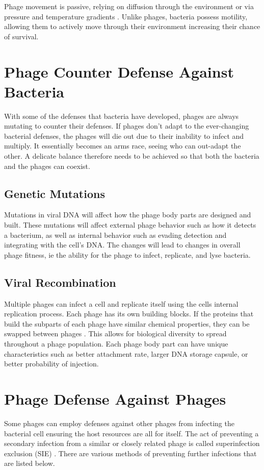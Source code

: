 Phage movement is passive, relying on diffusion through the environment or via pressure and temperature gradients \cite{lohrmannInfluenceBacterialSwimming2024}. 
Unlike phages, bacteria possess motility, allowing them to actively move through their environment increasing their chance of survival. 

\section{Phage Counter Defense Against Bacteria}
With some of the defenses that bacteria have developed, phages are always mutating to counter their defenses. 
If phages don't adapt to the ever-changing bacterial defenses, the phages will die out due to their inability to infect and multiply. 
It essentially becomes an arms race, seeing who can out-adapt the other. 
A delicate balance therefore needs to be achieved so that both the bacteria and the phages can coexist. 

\subsection{Genetic Mutations}
Mutations in viral DNA will affect how the phage body parts are designed and built. 
These mutations will affect external phage behavior such as how it detects a bacterium, as well as internal behavior such as evading detection and integrating with the cell's DNA. 
The changes will lead to changes in overall phage fitness, ie the ability for the phage to infect, replicate, and lyse bacteria. 

\subsection{Viral Recombination}
Multiple phages can infect a cell and replicate itself using the cells internal replication process. 
Each phage has its own building blocks. 
If the proteins that build the subparts of each phage have similar chemical properties, they can be swapped between phages \cite{aksyukBacteriophageAssembly2011}. 
This allows for biological diversity to spread throughout a phage population. 
Each phage body part can have unique characteristics such as better attachment rate, larger DNA storage capsule, or better probability of injection. 


\section{Phage Defense Against Phages}
Some phages can employ defenses against other phages from infecting the bacterial cell ensuring the host resources are all for itself. 
The act of preventing a secondary infection from a similar or closely related phage is called superinfection exclusion (SIE) \cite{patelAntiphageDefenceInhibition2024}. 
There are various methods of preventing further infections that are listed below. 

